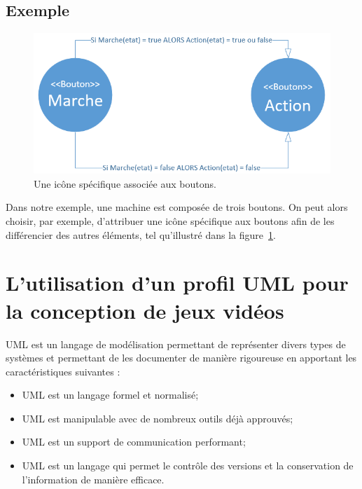 \subsection*{Exemple}
%
\begin{figure}[H]
    \begin{center}
    \includegraphics[width=12cm]{10_img/chap4/etat.PNG}
    \caption{Une ic\^one spécifique associ\'ee aux boutons.}
    \label{fig.uml_img}
    \end{center}
\end{figure}

Dans notre exemple, une machine est composée de trois boutons.
On peut alors choisir, par exemple, d'attribuer une ic\^one spécifique aux boutons afin de les différencier des autres éléments, tel qu'illustr\'e dans la figure~\ref{fig.uml_img}.




\section{L'utilisation d'un profil UML pour la conception de jeux vidéos}


UML est un langage de modélisation permettant de représenter divers types de systèmes et permettant de les documenter de manière rigoureuse en apportant les caractéristiques suivantes :

\begin{itemize}
    \item UML est un langage formel et normalisé;
    \item UML est manipulable avec de nombreux outils déjà approuvés;
    \item UML est un support de communication performant;
    \item UML est un langage qui permet le contrôle des versions et la conservation de l'information de manière efficace.
\end{itemize}


